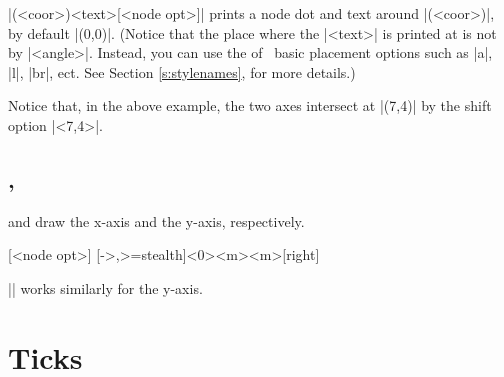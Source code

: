 \begin{tzcode}{.3}
\end{tzcode}

|\tzshoworigin*(<coor>){<text>}[<node opt>]| prints a node dot and text around |(<coor>)|, by default |(0,0)|. (Notice that the place where the |<text>| is printed at is not by |<angle>|. Instead, you can use the  of \Tikz\ basic placement options such as |a|, |l|, |br|, ect. See Section \ref{s:stylenames}, for more details.)

\begin{tzcode}{.3}
\end{tzcode}

Notice that, in the above example, the two axes intersect at |(7,4)| by the shift option |<7,4>|.

\subsection{\protect\cmd{\tzaxisx}, \protect\cmd{\tzaxisy}}
\label{ssi:tzaxesx}

\icmd{\tzaxisx} and \icmd{\tzaxisy} draw the x-axis and the y-axis, respectively.

\begin{tzdef}{}
[<node opt>]
  [->,>=stealth]<0>{<m>}{<m>}{}[right]
\end{tzdef}

|\tzaxisy| works similarly for the y-axis.

\begin{tzcode}{.3}
\end{tzcode}


\section{Ticks}
\label{si:tikzs}

